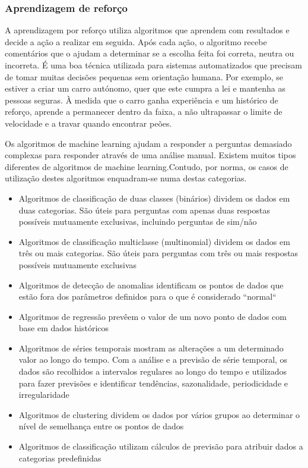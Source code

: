 \documentclass[a4paper,10pt]{article}
\begin{document}
\subsubsection{Aprendizagem de reforço}

A aprendizagem por reforço utiliza algoritmos que aprendem com resultados e decide a ação a realizar em seguida.
Após cada ação, o algoritmo recebe comentários que o ajudam a determinar se a escolha feita foi correta, neutra ou incorreta.
É uma boa técnica utilizada para sistemas automatizados que precisam de tomar muitas decisões pequenas sem orientação humana.
Por exemplo, se estiver a criar um carro autónomo, quer que este cumpra a lei e mantenha as pessoas seguras.
À medida que o carro ganha experiência e um histórico de reforço, aprende a permanecer dentro da faixa, a não ultrapassar o limite de velocidade e a travar quando encontrar peões.

Os algoritmos de machine learning ajudam a responder a perguntas demasiado complexas para responder através de uma análise manual.
Existem muitos tipos diferentes de algoritmos de machine learning.Contudo, por norma, os casos de utilização destes algoritmos enquadram-se numa destas categorias.
\begin{itemize}
    \item Algoritmos de classificação de duas classes (binários) dividem os dados em duas categorias. São úteis para perguntas com apenas duas respostas possíveis mutuamente exclusivas, incluindo perguntas de sim/não
    \item Algoritmos de classificação multiclasse (multinomial) dividem os dados em três ou mais categorias. São úteis para perguntas com três ou mais respostas possíveis mutuamente exclusivas
    \item Algoritmos de detecção de anomalias identificam os pontos de dados que estão fora dos parâmetros definidos para o que é considerado ``normal``
    \item Algoritmos de regressão prevêem o valor de um novo ponto de dados com base em dados históricos
    \item Algoritmos de séries temporais mostram as alterações a um determinado valor ao longo do tempo. Com a análise e a previsão de série temporal, os dados são recolhidos a intervalos regulares ao longo do tempo e utilizados para fazer previsões e identificar tendências, sazonalidade, periodicidade e irregularidade
    \item Algoritmos de clustering dividem os dados por vários grupos ao determinar o nível de semelhança entre os pontos de dados
    \item Algoritmos de classificação utilizam cálculos de previsão para atribuir dados a categorias predefinidas
\end{itemize}
\end{document}
